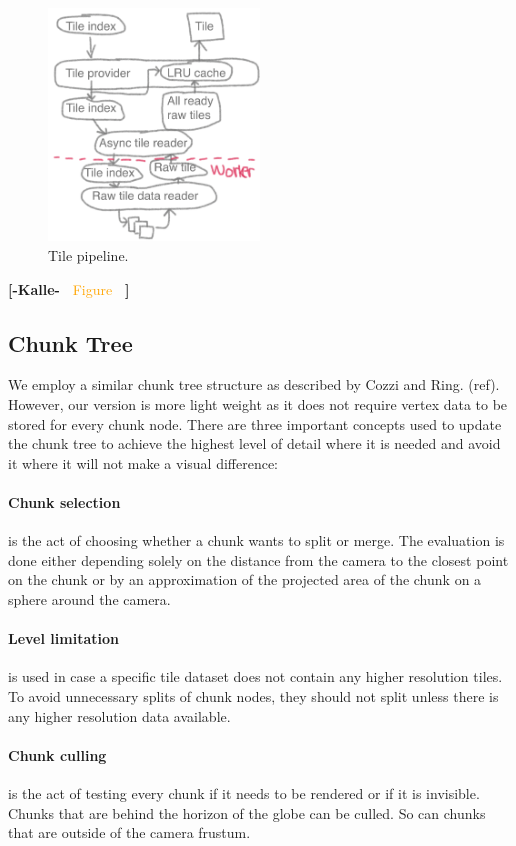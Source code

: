 \documentclass[journal]{vgtc}                %
\newcommand{\kallecomment}[1]{\textbf{[-Kalle-~}
    \textcolor{orange}{#1}
    \textbf{~]}}
\begin{document}
\begin{figure}[h]
  \centering
    \includegraphics[width=0.5\textwidth]{figures/tile_pipeline.png}
  \caption{Tile pipeline.}
\end{figure}

\kallecomment{Figure}

\subsection{Chunk Tree}

We employ a similar chunk tree structure as described by Cozzi and Ring. (ref).
However, our version is more light weight as it does not require vertex data to be stored for every chunk node.
There are three important concepts used to update the chunk tree to achieve the highest level of detail where it is needed and avoid it where it will not make a visual difference:

\paragraph{Chunk selection} is the act of choosing whether a chunk wants to split or merge.
The evaluation is done either depending solely on the distance from the camera to the closest point on the chunk or by an approximation of the projected area of the chunk on a sphere around the camera.

\paragraph{Level limitation} is used in case a specific tile dataset does not contain any higher resolution tiles.
 To avoid unnecessary splits of chunk nodes, they should not split unless there is any higher resolution data available.

\paragraph{Chunk culling} is the act of testing every chunk if it needs to be rendered or if it is invisible.
Chunks that are behind the horizon of the globe can be culled.
So can chunks that are outside of the camera frustum.
\end{document}
